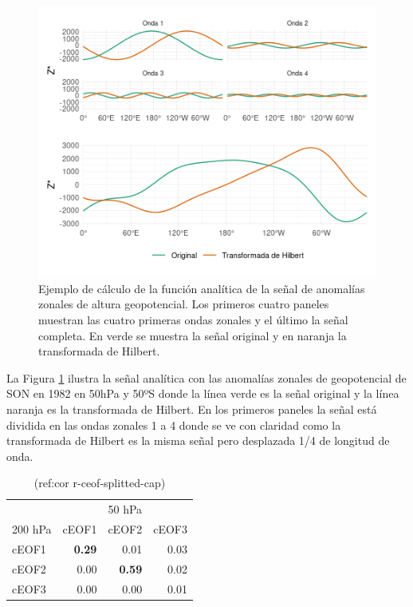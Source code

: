 \documentclass[12pt,oneside]{reedthesis}
\begin{document}
\begin{figure}
\includegraphics{figures/20-ceofs/hilbert-ejemplo-1} \caption{Ejemplo de cálculo de la función analítica de la señal de anomalías zonales de altura geopotencial. Los primeros cuatro paneles muestran las cuatro primeras ondas zonales y el último la señal completa. En verde se muestra la señal original y en naranja la transformada de Hilbert.}\label{fig:hilbert-ejemplo}
\end{figure}

La Figura \ref{fig:hilbert-ejemplo} ilustra la señal analítica con las anomalías zonales de geopotencial de SON en 1982 en 50hPa y 50ºS donde la línea verde es la señal original y la línea naranja es la transformada de Hilbert.
En los primeros paneles la señal está dividida en las ondas zonales 1 a 4 donde se ve con claridad como la transformada de Hilbert es la misma señal pero desplazada 1/4 de longitud de onda.



\begin{table}

\caption{\label{tab:corr-ceof-splitted}(ref:cor r-ceof-splitted-cap)}
\centering
\begin{tabular}[t]{l>{}r>{}r>{}r}
\toprule
\multicolumn{1}{c}{} & \multicolumn{3}{c}{50 hPa} \\
\cmidrule(l{3pt}r{3pt}){2-4}
200 hPa & cEOF1 & cEOF2 & cEOF3\\
\midrule
cEOF1 & \textbf{0.29} & 0.01 & 0.03\\
cEOF2 & 0.00 & \textbf{0.59} & 0.02\\
cEOF3 & 0.00 & 0.00 & 0.01\\
\bottomrule
\end{tabular}
\end{table}
\end{document}
